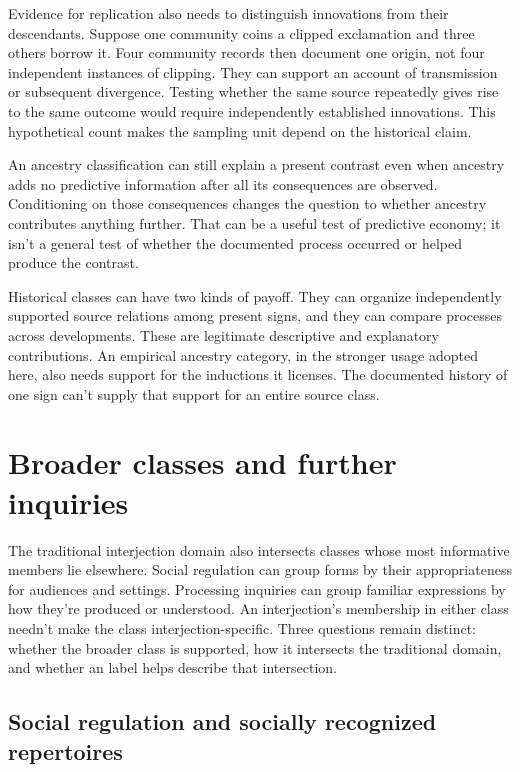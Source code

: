 \documentclass[12pt]{article}
\begin{document}
Evidence for replication also needs to distinguish innovations from their
descendants. Suppose one community coins a clipped exclamation and
three others borrow it. Four community records then document one
origin, not four independent instances of clipping. They can support
an account of transmission or subsequent divergence. Testing whether
the same source repeatedly gives rise to the same outcome would
require independently established innovations. This hypothetical count
makes the sampling unit depend on the historical claim.

An ancestry classification can still explain a present contrast even
when ancestry adds no predictive information after all its consequences
are observed. Conditioning on those consequences changes the question
to whether ancestry contributes anything further. That can be a useful
test of predictive economy; it isn't a general test of whether the
documented process occurred or helped produce the contrast.

Historical classes can have two kinds of payoff. They can
organize independently supported source relations among present signs,
and they can compare processes across developments. These are legitimate
descriptive and explanatory contributions. An empirical ancestry category,
in the stronger usage adopted here, also needs support for the
inductions it licenses. The documented history of one sign can't supply
that support for an entire source class.

\section{Broader classes and further inquiries}\label{sec:extensions}

The traditional interjection domain also intersects classes whose most
informative members lie elsewhere. Social regulation can group forms
by their appropriateness for audiences and settings. Processing inquiries
can group familiar expressions by how they're produced or understood.
An interjection's membership in either class needn't make the class
interjection-specific. Three questions remain distinct: whether the
broader class is supported, how it intersects the traditional domain,
and whether an  label helps describe that intersection.

\subsection{Social regulation and socially recognized repertoires}
\end{document}
